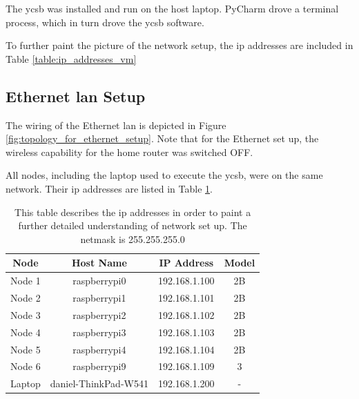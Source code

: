 The \gls{ycsb} was installed and run on the host laptop.  PyCharm drove a terminal process, which in turn drove the \gls{ycsb} software.

To further paint the picture of the network setup, the \gls{ip} addresses are included in Table \ref{table:ip_addresses_vm}

\subsection{Ethernet \gls{lan} Setup}

The wiring of the Ethernet \gls{lan} is depicted in Figure \ref{fig:topology_for_ethernet_setup}.  Note that for the Ethernet set up, the wireless capability for the home router was switched OFF.

All nodes, including the laptop used to execute the \gls{ycsb}, were on the same network.  Their \gls{ip} addresses are listed in Table \ref{table:ip_addresses_rp}.

\begin{table}
\begin{center}
 \begin{tabular}{||c c c c||} 
 \hline
 Node & Host Name & IP Address & Model \\ [0.5ex] 
 \hline\hline
 Node 1 & raspberrypi0 & 192.168.1.100 & 2B \\ 
 \hline
 Node 2 & raspberrypi1 & 192.168.1.101 & 2B  \\
 \hline
 Node 3 & raspberrypi2 & 192.168.1.102 & 2B \\
 \hline
 Node 4 & raspberrypi3 & 192.168.1.103 & 2B \\
 \hline
 Node 5 & raspberrypi4 & 192.168.1.104 & 2B \\
 \hline
 Node 6 & raspberrypi9 & 192.168.1.109 & 3 \\
 \hline 
 Laptop & daniel-ThinkPad-W541 &192.168.1.200 & - \\
 \hline
\end{tabular}
\end{center}
\caption{This table describes the \gls{ip} addresses in order to paint a further detailed understanding of network set up.  The netmask is 255.255.255.0}
\label{table:ip_addresses_rp}
\end{table}

